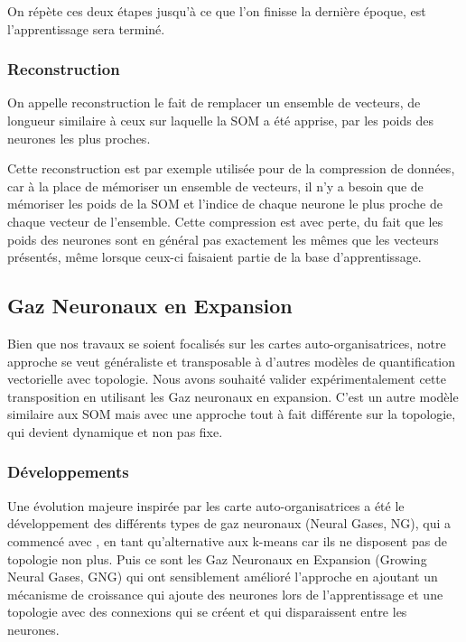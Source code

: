 	On répète ces deux étapes jusqu'à ce que l'on finisse la dernière époque, est l'apprentissage sera terminé.

\subsubsection{Reconstruction}
	
	On appelle reconstruction le fait de remplacer un ensemble de vecteurs, de longueur similaire à ceux sur laquelle la SOM a été apprise, par les poids des neurones les plus proches.

	Cette reconstruction est par exemple utilisée pour de la compression de données, car à la place de mémoriser un ensemble de vecteurs, il n'y a besoin que de mémoriser les poids de la SOM et l'indice de chaque neurone le plus proche de chaque vecteur de l'ensemble. Cette compression est avec perte, du fait que les poids des neurones sont en général pas exactement les mêmes que les vecteurs présentés, même lorsque ceux-ci faisaient partie de la base d'apprentissage.

	\subsection{Gaz Neuronaux en Expansion}

	Bien que nos travaux se soient focalisés sur les cartes auto-organisatrices, notre approche se veut généraliste et transposable à d'autres modèles de quantification vectorielle avec topologie. Nous avons souhaité valider expérimentalement cette transposition en utilisant les Gaz neuronaux en expansion. C'est un autre modèle similaire aux SOM mais avec une approche tout à fait différente sur la topologie, qui devient dynamique et non pas fixe. 

	\subsubsection{Développements}

	Une évolution majeure inspirée par les carte auto-organisatrices a été le développement des différents types de gaz neuronaux (Neural Gases, NG), qui a commencé avec \cite{martinetz1991neural}, en tant qu'alternative aux k-means car ils ne disposent pas de topologie non plus. Puis ce sont les Gaz Neuronaux en Expansion (Growing Neural Gases, GNG) \cite{fritzke1995growing} qui ont sensiblement amélioré l'approche en ajoutant un mécanisme de croissance qui ajoute des neurones lors de l'apprentissage et une topologie avec des connexions qui se créent et qui disparaissent entre les neurones.

